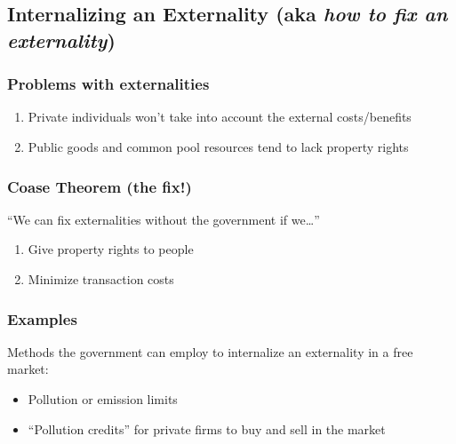 \documentclass[
  letterpaper,
  DIV=11,
  numbers=noendperiod]{scrartcl}
\providecommand{\tightlist}{%
  \setlength{\itemsep}{0pt}\setlength{\parskip}{0pt}}\usepackage{longtable,booktabs,array}
\begin{document}
\subsection{\texorpdfstring{Internalizing an Externality (aka \emph{how
to fix an
externality})}{Internalizing an Externality (aka how to fix an externality)}}\label{internalizing-an-externality-aka-how-to-fix-an-externality}

\subsubsection{Problems with
externalities}\label{problems-with-externalities}

\begin{enumerate}
\def\labelenumi{\arabic{enumi})}
\tightlist
\item
  Private individuals won't take into account the external
  costs/benefits
\item
  Public goods and common pool resources tend to lack property rights
\end{enumerate}

\subsubsection{Coase Theorem (the fix!)}\label{coase-theorem-the-fix}

``We can fix externalities without the government if we\ldots{}''

\begin{enumerate}
\def\labelenumi{\arabic{enumi})}
\tightlist
\item
  Give property rights to people
\item
  Minimize transaction costs
\end{enumerate}

\subsubsection{Examples}\label{examples-1}

Methods the government can employ to internalize an externality in a
free market:

\begin{itemize}
\tightlist
\item
  Pollution or emission limits
\item
  ``Pollution credits'' for private firms to buy and sell in the market
\end{itemize}

\newpage{}
\end{document}
